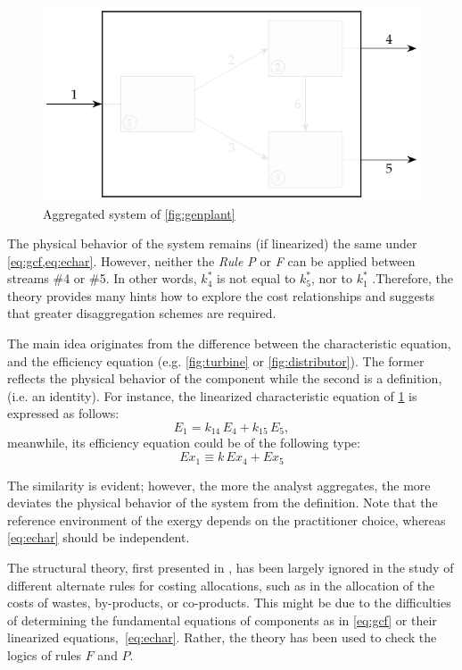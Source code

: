 \documentclass[energies,article,submit,moreauthors,pdftex]{Definitions/mdpi}
\begin{document}
\begin{figure}[ht]
    \centering
    \includegraphics[scale=0.9]{genplanta}
    \caption{Aggregated system of \cref{fig:genplant}}
    \label{fig:genplanta}
\end{figure}
The physical behavior of the system remains (if linearized) the same under \cref{eq:gcf,eq:echar}. However, neither the \emph{Rule P} or \emph{F} can be applied between streams \#4 or \#5. In other words, $k_4^*$ is not equal to $k_5^*$, nor to $k_1^*$ .Therefore, the theory provides many hints how to explore the cost relationships and suggests that greater disaggregation schemes are required.

The main idea originates from the difference between the characteristic equation, and the efficiency equation (e.g. \cref{fig:turbine} or \cref{fig:distributor}). The former reflects the physical behavior of the component while the second is a definition, (i.e. an identity). For instance, the linearized characteristic equation of \cref{fig:genplanta} is expressed as follows:
\[
    E_1=k_{14}\,E_4 + k_{15}\,E_5,
\]
meanwhile, its efficiency equation could be of the following type:
\[
   Ex_{1} \equiv k\,Ex_{4}+Ex_{5}
\]

The similarity is evident; however, the more the analyst aggregates, the more deviates the physical behavior of the system from the definition. Note that the reference environment of the exergy depends on the practitioner choice, whereas \cref{eq:echar} should be independent.

The structural theory, first presented in \cite{Valero1992a,Valero1993}, has been largely ignored in the study of different alternate rules for costing allocations, such as in the allocation of the costs of wastes, by-products, or co-products. This might be due to the difficulties of determining the fundamental equations of components as in \cref{eq:gcf} or their linearized equations,~\cref{eq:echar}. Rather, the theory has been used to check the logics of rules $F$ and $P$.
\end{document}
